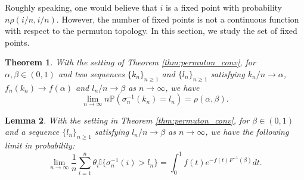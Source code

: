 \documentclass[10pt]{article}
\newtheorem{thm}{Theorem}[section]
\newtheorem{lem}[thm]{Lemma}
\numberwithin{equation}{section}
\begin{document}
    Roughly speaking, one would believe that $i$ is a fixed point with probability $n\rho(i/n,i/n)$. However, the number of fixed points is not a continuous function with respect to the permuton topology. In this section, we study the set of fixed points.

    \begin{thm}\label{thm:pointwise}
        With the setting of Theorem \ref{thm:permuton_conv}, for $\alpha,\beta \in (0,1)$ and two sequences $\{k_n\}_{n\geq 1}$ and $\{l_n\}_{n\geq 1}$ satisfying $k_n/n\to \alpha$, $f_n(k_n)\to f(\alpha)$ and $l_n/n\to \beta$ as $n\to \infty$, we have
        \begin{equation}
            \lim_{n\to \infty}n\mathbb P(\sigma^{-1}_n(k_n)=l_n)=\rho (\alpha,\beta).
        \end{equation}
    \end{thm}

    \begin{lem}\label{lem:rest-theta}
        With the setting in Theorem \ref{thm:permuton_conv}, for $\beta \in (0,1)$ and a sequence $\{l_n\}_{n\geq 1}$ satisfying $l_n/n\to \beta$ as $n\to \infty$, we have the following limit in probability:
        \begin{equation}
            \lim_{n\to \infty} \frac{1}{n}\sum_{i=1}^{n}\theta_i \mathbb I\{\sigma^{-1}_n(i)>l_n\} = \int_0^1f(t)e^{-f(t)F^{-1}(\beta)}dt.
        \end{equation}
    \end{lem}
\end{document}
